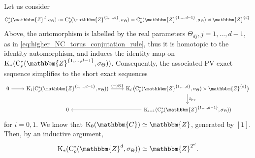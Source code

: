 \documentclass{amsart}
\numberwithin{figure}{section}
\numberwithin{equation}{section}
\numberwithin{table}{section}
\theoremstyle{plain}
\theoremstyle{definition}
\theoremstyle{remark}
\theoremstyle{nonumber}
\newcommand{\Z}{\mathbb{Z}}
\newcommand{\C}{\mathbb{C}}
\newcommand{\K}{\relax\ifmmode\operatorname{K}\else\textup{K}\fi}
\newcommand{\Cst}{\relax\ifmmode\mathrm{C}^*\else\textup{C*}\fi}
\newcommand{\Cstr}{\Cst_\rho} %
\newcommand{\defeq}{\mathrel{\vcentcolon=}}
\newcommand{\blank}{-}
\renewcommand{\mathbb}{\mathbbm} %
\begin{document}
Let us consider
\[
  \Cstr(\Z^d,\sigma_\Theta)\defeq \Cstr(\Z^{\{1,\ldots,d\}},\sigma_\Theta)=\Cstr(\Z^{\{1,\ldots,d-1\}},\sigma_\Theta)\rtimes\Z^{\{d\}}.
\]
Above, the automorphism is labelled by the real parameters $\Theta_{dj}, j=1,\ldots,d-1$, as in \eqref{eq:higher_NC_torus_conjutation_rule}, thus it is homotopic to the identity automorphism, and induces the identity map on $\K_*(\Cstr(\Z^{\{1,\ldots,d-1\}},\sigma_\Theta))$. Consequently, the associated PV exact sequence simplifies to the short exact sequences
\begin{equation}\label{eq:higher_NC_PV_SES}
\begin{tikzcd}
0\ar[r] & \K_i(\Cstr(\Z^{\{1,\ldots,d-1\}},\sigma_\Theta)) \ar[r,"(\blank)\otimes 1"] & \K_i\big(\Cstr(\Z^{\{1,\ldots,d\}},\sigma_\Theta)\rtimes\Z^{\{d\}}\big)\ar[d,"\partial_{{\rm PV}}"] \\
{} & 0 & \K_{i-1}(\Cstr(\Z^{\{1,\ldots,d-1\}},\sigma_\Theta))\ar[l]
\end{tikzcd}
\end{equation}
for $i=0,1$.
We know that $\K_0(\C)\simeq\Z$, generated by $[1]$. Then, by an inductive argument, \begin{equation}\label{eq:complex_K_groups_torus}
\K_*(\Cstr(\Z^d,\sigma_\Theta))\simeq \Z^{2^d}.
\end{equation}
\end{document}
